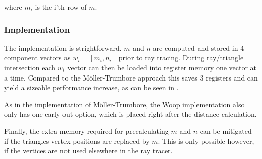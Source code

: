 where $m_i$ is the i'th row of $m$.

\subsubsection{Implementation}

The implementation is strightforward. $m$ and $n$ are computed and stored in 4
component vectors as $w_i = \left[m_i, n_i \right]$ prior to ray tracing. During
ray/triangle intersection each $w_i$ vector can then be loaded into register
memory one vector at a time. Compared to the Möller-Trumbore approach this saves
3 registers and can yield a sizeable performance increase, as can be seen in
.


As in the implementation of Möller-Trumbore, the Woop implementation also only
has one early out option, which is placed right after the distance calculation.


Finally, the extra memory required for precalculating $m$ and $n$ can be
mitigated if the triangles vertex positions are replaced by $m$. This is only
possible however, if the vertices are not used elsewhere in the ray tracer.

